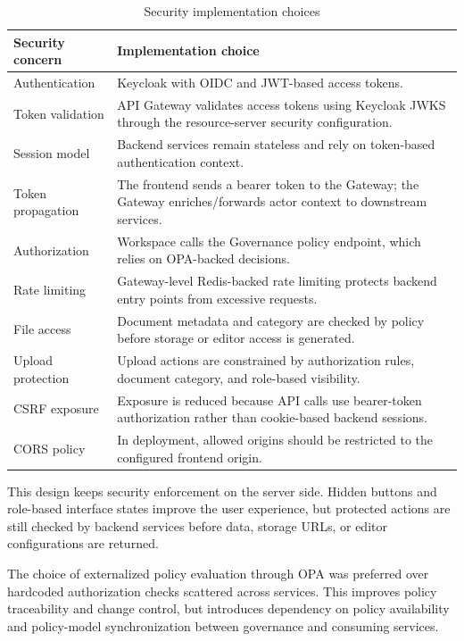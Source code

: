 \begin{table}[!htbp]
\centering
\caption{Security implementation choices}
\label{tab:security-implementation-choices}
\footnotesize
\setlength{\tabcolsep}{4pt}
\renewcommand{\arraystretch}{1.14}
\begin{tabularx}{\textwidth}{|L{3.2cm}|Y|}
\hline
\textbf{Security concern} & \textbf{Implementation choice} \\
\hline
Authentication & Keycloak with OIDC and JWT-based access tokens. \\
\hline
Token validation & API Gateway validates access tokens using Keycloak JWKS through the resource-server security configuration. \\
\hline
Session model & Backend services remain stateless and rely on token-based authentication context. \\
\hline
Token propagation & The frontend sends a bearer token to the Gateway; the Gateway enriches/forwards actor context to downstream services. \\
\hline
Authorization & Workspace calls the Governance policy endpoint, which relies on OPA-backed decisions. \\
\hline
Rate limiting & Gateway-level Redis-backed rate limiting protects backend entry points from excessive requests. \\
\hline
File access & Document metadata and category are checked by policy before storage or editor access is generated. \\
\hline
Upload protection & Upload actions are constrained by authorization rules, document category, and role-based visibility. \\
\hline
CSRF exposure & Exposure is reduced because API calls use bearer-token authorization rather than cookie-based backend sessions. \\
\hline
CORS policy & In deployment, allowed origins should be restricted to the configured frontend origin. \\
\hline
\end{tabularx}
\normalsize
\end{table}

This design keeps security enforcement on the server side. Hidden buttons and
role-based interface states improve the user experience, but protected actions
are still checked by backend services before data, storage URLs, or editor
configurations are returned.

The choice of externalized policy evaluation through OPA was preferred over
hardcoded authorization checks scattered across services. This improves policy
traceability and change control, but introduces dependency on policy
availability and policy-model synchronization between governance and consuming
services.

